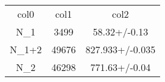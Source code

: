 \begin{table}
\begin{tabular}{ccc}
col0 & col1 & col2 \\
N_1 & 3499 & 58.32+/-0.13 \\
N_{1+2} & 49676 & 827.933+/-0.035 \\
N_{2} & 46298 & 771.63+/-0.04 \\
\end{tabular}
\end{table}
